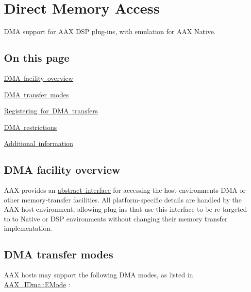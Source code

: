 \hypertarget{a00810}{}\section{Direct Memory Access}
\label{a00810}
D\+MA support for A\+AX D\+SP plug-\/ins, with emulation for A\+AX Native. 

\hypertarget{a00810_algdmapagecontents}{}\subsection{On this page}\label{a00810_algdmapagecontents}
\begin{DoxyItemize}
\item \mbox{\hyperlink{a00810_alg_dma_overview}{D\+MA facility overview}} \item \mbox{\hyperlink{a00810_alg_dma_modes}{D\+MA transfer modes}} \item \mbox{\hyperlink{a00810_alg_dma_registration}{Registering for D\+MA transfers}} \item \mbox{\hyperlink{a00810_alg_dma_restrictions}{D\+MA restrictions}} \item \mbox{\hyperlink{a00810_alg_dma_additionalinformation}{Additional information}}\end{DoxyItemize}
\hypertarget{a00810_alg_dma_overview}{}\subsection{D\+M\+A facility overview}\label{a00810_alg_dma_overview}
A\+AX provides an \mbox{\hyperlink{a01809}{abstract interface}} for accessing the host environment\textquotesingle{}s D\+MA or other memory-\/transfer facilities. All platform-\/specific details are handled by the A\+AX host environment, allowing plug-\/ins that use this interface to be re-\/targeted to to Native or D\+SP environments without changing their memory transfer implementation.\hypertarget{a00810_alg_dma_modes}{}\subsection{D\+M\+A transfer modes}\label{a00810_alg_dma_modes}
A\+AX hosts may support the following D\+MA modes, as listed in \mbox{\hyperlink{a01809_af8d0f19f2896dd6dbd126b919b24e39b}{A\+A\+X\+\_\+\+I\+Dma\+::\+E\+Mode}} \+:

